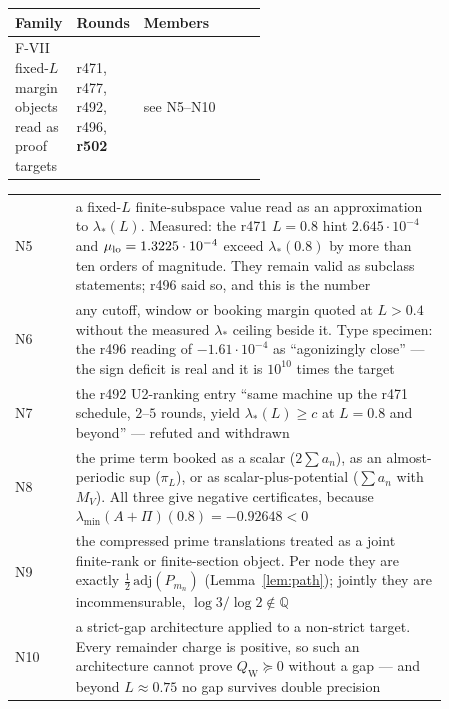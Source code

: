 \documentclass[11pt]{article}
\theoremstyle{remark}
\newcommand{\QW}{Q_{\mathrm W}}
\begin{document}
\begin{center}
\small
\begin{tabular}{@{}llp{0.50\linewidth}@{}}
\toprule
Family & Rounds & Members \\
\midrule
F-VII fixed-$L$ margin objects read as
  proof targets
  & r471, r477, r492, r496, \textbf{r502}
  & see N5--N10 \\
\bottomrule
\end{tabular}
\end{center}

\begin{center}
\small
\begin{tabular}{@{}lp{0.86\linewidth}@{}}
\toprule
N5 & a fixed-$L$ finite-subspace value read as an approximation to
     $\lambda_*(L)$.  Measured: the r471 $L=0.8$ hint
     $2.645\cdot10^{-4}$ and $\mu_{\rm lo}=1.3225\cdot10^{-4}$ exceed
     $\lambda_*(0.8)$ by more than ten orders of magnitude.  They
     remain valid as subclass statements; r496 said so, and this is
     the number \\
N6 & any cutoff, window or booking margin quoted at $L>0.4$ without
     the measured $\lambda_*$ ceiling beside it.  Type specimen: the
     r496 reading of $-1.61\cdot10^{-4}$ as ``agonizingly close'' ---
     the sign deficit is real and it is $10^{10}$ times the target \\
N7 & the r492 U2-ranking entry ``same machine up the r471 schedule,
     $2$--$5$ rounds, yield $\lambda_*(L)\ge c$ at $L=0.8$ and
     beyond'' --- refuted and withdrawn \\
N8 & the prime term booked as a scalar ($2\sum a_n$), as an
     almost-periodic sup ($\pi_L$), or as scalar-plus-potential
     ($\sum a_n$ with $M_V$).  All three give negative certificates,
     because $\lambda_{\min}(A+\Pi)(0.8)=-0.92648<0$ \\
N9 & the compressed prime translations treated as a joint finite-rank
     or finite-section object.  Per node they are exactly
     $\tfrac12\,\mathrm{adj}(P_{m_n})$ (Lemma~\ref{lem:path});
     jointly they are incommensurable, $\log3/\log2\notin\mathbb Q$ \\
N10 & a strict-gap architecture applied to a non-strict target.
     Every remainder charge is positive, so such an architecture
     cannot prove $\QW\succeq0$ without a gap --- and beyond
     $L\approx0.75$ no gap survives double precision \\
\bottomrule
\end{tabular}
\end{center}
\end{document}
